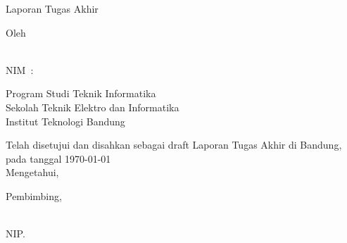 
\begin{center}
  \smallskip
  \thispagestyle{empty}
  \Large \bfseries \MakeUppercase{\thetitle}
  \vfill

  \normalsize Laporan Tugas Akhir
  \vfill

  \large Oleh
  
  \large \uppercase{\theauthor} \\
  \large NIM~:~\uppercase{\nim}

  \vfill

  \normalfont{}
  \normalsize Program Studi Teknik Informatika \\
  \normalsize Sekolah Teknik Elektro dan Informatika \\
  \normalsize Institut Teknologi Bandung \\
  \vfill

  \normalsize Telah disetujui dan disahkan sebagai draft Laporan Tugas Akhir di Bandung, pada tanggal \today \\
  \normalsize Mengetahui, \\
  \vfill

  Pembimbing,
  \vfill

  \underline{\supervisor{}} \\
  NIP.\@ \uppercase{\supervisornip{}} \\
  
\end{center}